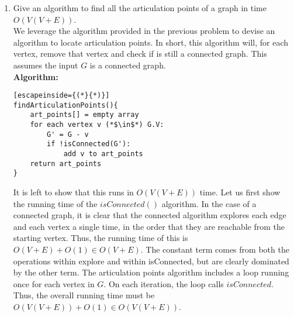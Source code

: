\documentclass{article}
\begin{document}
\begin{enumerate}
\begin{enumerate}
\begin{lstlisting}[escapeinside={(*}{*)}]
explore(G,v){
	visited(v) = true
	add v to seen
	for each edge(v,u)(*$\in$*) G.E:
		if not visited(u):
			explore(u)
}
		\end{lstlisting}
This algorithm simply explores the graph $G$ starting at any vertex in $V$, and returns true if all other vertices are reachable from that arbitrary vertex. As this graph is undirected, if is enough to check one single vertex, as any path $v,u$ in the graph is reflexive giving us path $u,v$. Thus, all nodes $u$ reachable by one node $v$ are also reachable by each of the nodes $u$.
		\item Give an algorithm to find all the articulation points of a graph in time $O(V(V+E))$.
		\\ We leverage the algorithm provided in the previous problem to devise an algorithm to locate articulation points. In short, this algorithm will, for each vertex, remove that vertex and check if is still a connected graph. This assumes the input $G$ is a connected graph.
		\\ \textbf{Algorithm:}
		\begin{lstlisting}[escapeinside={(*}{*)}]
findArticulationPoints(){
	art_points[] = empty array
	for each vertex v (*$\in$*) G.V:
		G' = G - v
		if !isConnected(G'):
			add v to art_points
	return art_points	
}
		\end{lstlisting}
	It is left to show that this runs in $O(V(V+E))$ time. Let us first show the running time of the $isConnected()$ algorithm. In the case of a connected graph, it is clear that the connected algorithm explores each edge and each vertex a single time, in the order that they are reachable from the starting vertex. Thus, the running time of this is $O(V+E)+O(1)\in O(V+E)$. The constant term comes from both the operations within explore and within isConnected, but are clearly dominated by the other term. The articulation points algorithm includes a loop running once for each vertex in $G$. On each iteration, the loop calls $isConnected$. Thus, the overall running time must be $O(V(V+E))+O(1)\in O(V(V+E))$.


\end{enumerate}
\end{enumerate}
\end{document}
